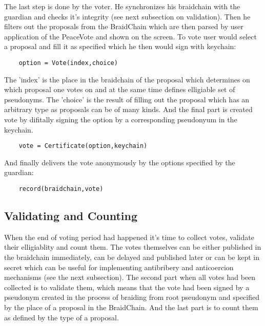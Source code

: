 \documentclass{article}
\begin{document}
The last step is done by the voter. He synchronizes his braidchain with the guardian and checks it's integrity (see next subsection on validation). Then he filters out the proposals from the BraidChain which are then parsed by user application of the PeaceVote and shown on the screen. To vote user would select a proposal and fill it as specified which he then would sign with keychain:
\begin{lstlisting}
    option = Vote(index,choice)
\end{lstlisting}
The 'index' is the place in the braidchain of the proposal which determines on which proposal one votes on and at the same time defines elligiable set of pseudonyms. The 'choice' is the result of filling out the proposal which has an arbitrary type as proposals can be of many kinds. And the final part is created vote by difitally signing the option by a corresponding pseudonyum in the keychain.
\begin{lstlisting}
    vote = Certificate(option,keychain)
\end{lstlisting}
And finally delivers the vote anonymously by the options specified by the guardian:
\begin{lstlisting}
    record(braidchain,vote)
\end{lstlisting}

\subsection{Validating and Counting}

When the end of voting period had happened it's time to collect votes, validate their elligiablity and count them. The votes themselves can be either published in the braidchain immediately, can be delayed and published later or can be kept in secret which can be useful for implementing antibribery and anticoercion mechanisms (see the next subsection). The second part when all votes had been collected is to validate them, which means that the vote had been signed by a pseudonym created in the process of braiding from root pseudonym and specified by the place of a proposal in the BraidChain. And the last part is to count them as defined by the type of a proposal.
\end{document}
